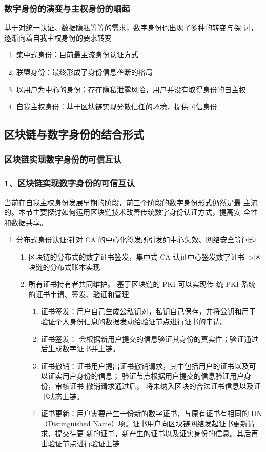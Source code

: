 \documentclass[11pt]{beamer}
\begin{document}
\begin{frame}
	\frametitle{数字身份的演变与主权身份的崛起}
	基于对统一认证、数据隐私等等的需求，数字身份也出现了多种的转变与探
	讨，逐渐向着自我主权身份的要求转变
	\begin{enumerate}
		\item 集中式身份：目前最主流身份认证方式
		\item 联盟身份：最终形成了身份信息垄断的格局
		\item 以用户为中心的身份：存在隐私泄露风险，用户并没有取得身份的自主权
		\item 自我主权身份：基于区块链实现分散信任的环境，提供可信身份
	\end{enumerate}
\end{frame}

\subsection{区块链与数字身份的结合形式}

\subsubsection{区块链实现数字身份的可信互认}
\begin{frame}[allowframebreaks]
	\frametitle{1、区块链实现数字身份的可信互认}
	{\scriptsize 当前在自我主权身份发展早期的阶段，前三个阶段的数字身份形式仍然是最
	主流的。本节主要探讨如何运用区块链技术改善传统数字身份认证方式，提高安
	全性和数据共享。}
\begin{enumerate}
	\item 分布式身份认证:针对 CA 的中心化签发所引发如中心失效、网络安全等问题
	\begin{enumerate}
		\item 区块链的分布式的数字证书签发，集中式 CA 认证中心签发数字证书-->区块链的分布式账本实现
		\item 所有证书持有者共同维护。 基于区块链的 PKI 可以实现传
		统 PKI 系统的证书申请、签发、验证和管理
		\begin{enumerate}
			\item 证书签发：用户自己生成公私钥对，私钥自己保存，并将公钥和用于
			验证个人身份信息的数据发动给验证节点进行证书的申请。
			\item 证书签发： 会根据新用户提交的信息验证其身份的真实性；验证通过
			后生成数字证书并上链。
			\item 证书撤销：证书用户提出证书撤销请求，其中包括用户的证书以及可
			以证实用户身份的信息； 验证节点根据用户提交的信息验证用户身份，审核证书
			撤销请求通过后， 将未纳入区块的合法证书信息以及证书状态上链。
			\item 证书更新：用户需要产生一份新的数字证书，与原有证书有相同的 DN
			（Distinguished Name）项。证书用户向区块链网络发起证书更新请求，提交待更
			新的证书，新产生的证书以及证实身份的信息。其后再由验证节点进行验证上链
		\end{enumerate}
	\end{enumerate}
\end{enumerate}
\end{frame}
\end{document}

